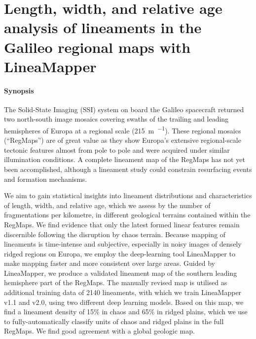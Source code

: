 \graphicspath{{appendices/}{regional_mosaics/}{Figures/}}

\chapter[LineaMapper on Galileo RegMaps]{Length, width, and relative age analysis of lineaments in the Galileo regional maps with LineaMapper}
\label{chapter:regional_mosaics}


\subsubsection{Synopsis}The Solid-State Imaging (SSI) system on board the Galileo spacecraft returned two north-south image mosaics covering swaths of the trailing and leading hemispheres of Europa at a regional scale (\qty{215}{\m~\px^{-1}}). These regional mosaics (``RegMaps'') are of great value as they show Europa’s extensive regional-scale tectonic features almost from pole to pole and were acquired under similar illumination conditions. A complete lineament map of the RegMaps has not yet been accomplished, although a lineament study could constrain resurfacing events and formation mechanisms.

We aim to gain statistical insights into lineament distributions and characteristics of length, width, and relative age, which we assess by the number of fragmentations per kilometre, in different geological terrains contained within the RegMaps. We find evidence that only the latest formed linear features remain discernible following the disruption by chaos terrain. Because mapping of lineaments is time-intense and subjective, especially in noisy images of densely ridged regions on Europa, we employ the deep-learning tool LineaMapper to make mapping faster and more consistent over large areas. Guided by LineaMapper, we produce a validated lineament map of the southern leading hemisphere part of the RegMaps. %
The manually revised map is utilised as additional training data of 2140 lineaments, with which we train LineaMapper v1.1 and v2.0, using two different deep learning models. 
Based on this map, we find a lineament density of 15\% in chaos and 65\% in ridged plains, which we use to fully-automatically classify units of chaos and ridged plains in the full RegMaps. We find good agreement with a global geologic map.


